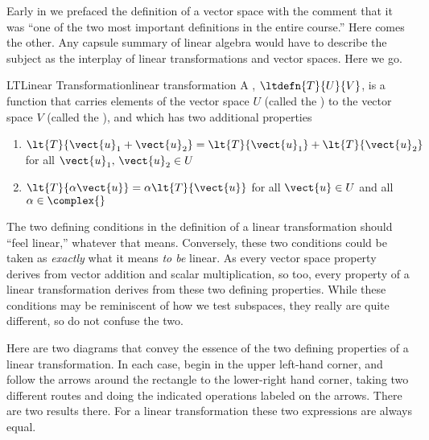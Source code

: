 %
Early in  we prefaced the definition of a vector space with the comment that it was ``one of the two most important definitions in the entire course.''  Here comes the other.  Any capsule summary of linear algebra would have to describe the subject as the interplay of linear transformations and vector spaces.  Here we go.
%
%
\begin{definition}{LT}{Linear Transformation}{linear transformation}
A , $\ltdefn{T}{U}{V}$, is a function that carries elements of the vector space $U$ (called the ) to the vector space $V$ (called the ), and which has two additional properties
%
\begin{enumerate}
\item $\lt{T}{\vect{u}_1+\vect{u}_2}=\lt{T}{\vect{u}_1}+\lt{T}{\vect{u}_2}$ for all $\vect{u}_1,\,\vect{u}_2\in U$
\item $\lt{T}{\alpha\vect{u}}=\alpha\lt{T}{\vect{u}}$ for all $\vect{u}\in U$ and all $\alpha\in\complex{\null}$
\end{enumerate}
%
\end{definition}
%
The two defining conditions in the definition of a linear transformation should ``feel linear,'' whatever that means.  Conversely, these two conditions could be taken as {\em exactly} what it means {\em to be} linear.  As every vector space property derives from vector addition and scalar multiplication, so too, every property of a linear transformation derives from these two defining properties.  While these conditions may be reminiscent of how we test subspaces, they really are quite different, so do not confuse the two.\par
%
Here are two diagrams that convey the essence of the two defining properties of a linear transformation.  In each case, begin in the upper left-hand corner, and follow the arrows around the rectangle to the lower-right hand corner, taking two different routes and doing the indicated operations labeled on the arrows.  There are two results there.  For a linear transformation these two expressions are always equal.
